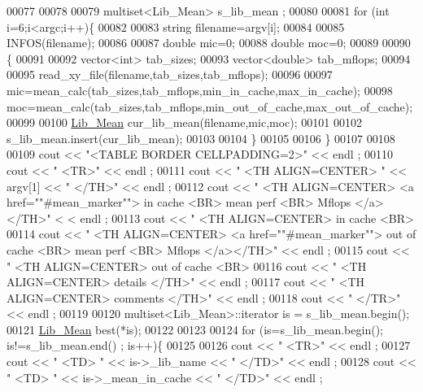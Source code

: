 \begin{DoxyCode}
00077 
00078 
00079   multiset<Lib\_Mean> s\_lib\_mean ;
00080 
00081   \textcolor{keywordflow}{for} (\textcolor{keywordtype}{int} i=6;i<argc;i++)\{
00082     
00083     \textcolor{keywordtype}{string} filename=argv[i];
00084     
00085     INFOS(filename);
00086 
00087     \textcolor{keywordtype}{double} mic=0;
00088     \textcolor{keywordtype}{double} moc=0;
00089 
00090     \{
00091       
00092       vector<int> tab\_sizes;
00093       vector<double> tab\_mflops;
00094 
00095       read\_xy\_file(filename,tab\_sizes,tab\_mflops);
00096 
00097       mic=mean\_calc(tab\_sizes,tab\_mflops,min\_in\_cache,max\_in\_cache);
00098       moc=mean\_calc(tab\_sizes,tab\_mflops,min\_out\_of\_cache,max\_out\_of\_cache);
00099 
00100       \hyperlink{class_lib___mean}{Lib\_Mean} cur\_lib\_mean(filename,mic,moc);
00101       
00102       s\_lib\_mean.insert(cur\_lib\_mean);  
00103 
00104     \}   
00105            
00106   \}
00107 
00108 
00109   cout << \textcolor{stringliteral}{"<TABLE BORDER CELLPADDING=2>"} << endl ;
00110   cout << \textcolor{stringliteral}{"  <TR>"} << endl ;
00111   cout << \textcolor{stringliteral}{"    <TH ALIGN=CENTER> "} << argv[1] << \textcolor{stringliteral}{" </TH>"} << endl ;
00112   cout << \textcolor{stringliteral}{"    <TH ALIGN=CENTER> <a href="}\textcolor{stringliteral}{"#mean\_marker"}\textcolor{stringliteral}{"> in cache <BR> mean perf <BR> Mflops </a></TH>"} <
      < endl ;
00113   cout << \textcolor{stringliteral}{"    <TH ALIGN=CENTER> in cache <BR> %
00114   cout << \textcolor{stringliteral}{"    <TH ALIGN=CENTER> <a href="}\textcolor{stringliteral}{"#mean\_marker"}\textcolor{stringliteral}{"> out of cache <BR> mean perf <BR> Mflops
       </a></TH>"} << endl ;
00115   cout << \textcolor{stringliteral}{"    <TH ALIGN=CENTER> out of cache <BR> %
00116   cout << \textcolor{stringliteral}{"    <TH ALIGN=CENTER> details </TH>"} << endl ;
00117   cout << \textcolor{stringliteral}{"    <TH ALIGN=CENTER> comments </TH>"} << endl ;
00118   cout << \textcolor{stringliteral}{"  </TR>"} << endl ;
00119 
00120   multiset<Lib\_Mean>::iterator is = s\_lib\_mean.begin();
00121   \hyperlink{class_lib___mean}{Lib\_Mean} best(*is);  
00122   
00123 
00124   \textcolor{keywordflow}{for} (is=s\_lib\_mean.begin(); is!=s\_lib\_mean.end() ; is++)\{
00125 
00126     cout << \textcolor{stringliteral}{"  <TR>"} << endl ;
00127     cout << \textcolor{stringliteral}{"     <TD> "} << is->\_lib\_name << \textcolor{stringliteral}{" </TD>"} << endl ;
00128     cout << \textcolor{stringliteral}{"     <TD> "} << is->\_mean\_in\_cache << \textcolor{stringliteral}{" </TD>"} << endl ;
}}
\end{DoxyCode}
